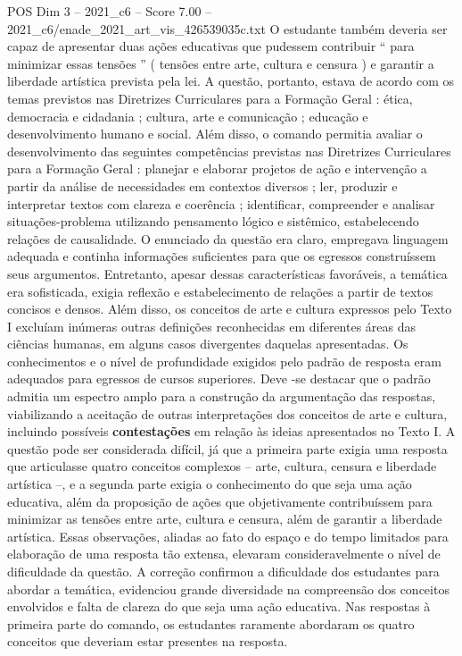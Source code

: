 \begin{textsample}{POS Dim 3 – 2021\_c6 – Score 7.00 – 2021\_c6/enade\_2021\_art\_vis\_426539035c.txt}
O estudante também deveria ser capaz de apresentar duas ações educativas que pudessem contribuir “ para minimizar essas tensões ” ( tensões entre arte, cultura e censura ) e garantir a liberdade artística prevista pela lei.
A questão, portanto, estava de acordo com os temas previstos nas Diretrizes Curriculares para a Formação Geral : ética, democracia e cidadania ; cultura, arte e comunicação ; educação e desenvolvimento humano e social.
Além disso, o comando permitia avaliar o desenvolvimento das seguintes competências previstas nas Diretrizes Curriculares para a Formação Geral : planejar e elaborar projetos de ação e intervenção a partir da análise de necessidades em contextos diversos ; ler, produzir e interpretar textos com clareza e coerência ; identificar, compreender e analisar situações-problema utilizando pensamento lógico e sistêmico, estabelecendo relações de causalidade.
O enunciado da questão era claro, empregava linguagem adequada e continha informações suficientes para que os egressos construíssem seus argumentos.
Entretanto, apesar dessas características favoráveis, a temática era sofisticada, exigia reflexão e estabelecimento de relações a partir de textos concisos e densos.
Além disso, os conceitos de arte e cultura expressos pelo Texto I excluíam inúmeras outras definições reconhecidas em diferentes áreas das ciências humanas, em alguns casos divergentes daquelas apresentadas.
Os conhecimentos e o nível de profundidade exigidos pelo padrão de resposta eram adequados para egressos de cursos superiores.
Deve -se destacar que o padrão admitia um espectro amplo para a construção da argumentação das respostas, viabilizando a aceitação de outras interpretações dos conceitos de arte e cultura, incluindo possíveis \textbf{contestações} em relação às ideias apresentados no Texto I.
A questão pode ser considerada difícil, já que a primeira parte exigia uma resposta que articulasse quatro conceitos complexos – arte, cultura, censura e liberdade artística –, e a segunda parte exigia o conhecimento do que seja uma ação educativa, além da proposição de ações que objetivamente contribuíssem para minimizar as tensões entre arte, cultura e censura, além de garantir a liberdade artística.
Essas observações, aliadas ao fato do espaço e do tempo limitados para elaboração de uma resposta tão extensa, elevaram consideravelmente o nível de dificuldade da questão.
A correção confirmou a dificuldade dos estudantes para abordar a temática, evidenciou grande diversidade na compreensão dos conceitos envolvidos e falta de clareza do que seja uma ação educativa.
Nas respostas à primeira parte do comando, os estudantes raramente abordaram os quatro conceitos que deveriam estar presentes na resposta.

\end{textsample}

